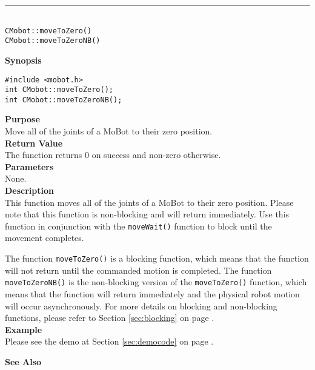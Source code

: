 \noindent
\vspace{5pt}
\rule{4.5in}{0.015in}\\
\noindent
{\LARGE \texttt{CMobot::moveToZero()}}\\
{\LARGE \texttt{CMobot::moveToZeroNB()}}\\
{}

\noindent
{\bf Synopsis}\\
\begin{verbatim}
#include <mobot.h>
int CMobot::moveToZero();
int CMobot::moveToZeroNB();
\end{verbatim}

\noindent
{\bf Purpose}\\
Move all of the joints of a MoBot to their zero position.\\

\noindent
{\bf Return Value}\\
The function returns 0 on success and non-zero otherwise.\\

\noindent
{\bf Parameters}\\
None.\\

\noindent
{\bf Description}\\
This function moves all of the joints of a MoBot to their zero position.
Please note that this function is non-blocking and will return immediately. Use
this function in conjunction with the \texttt{moveWait()} function to block
until the movement completes.

The function \texttt{moveToZero()} is a blocking function, which means that 
the function will not return until the commanded motion is 
completed. The function \texttt{moveToZeroNB()} is the non-blocking version of
the \texttt{moveToZero()} function, which means that the function will return
immediately and the physical robot motion will occur asynchronously. For
more details on blocking and non-blocking functions, please refer to 
Section \ref{sec:blocking} on page \pageref{sec:blocking}.\\

\noindent
{\bf Example}\\
Please see the demo at Section \ref{sec:democode} on page \pageref{sec:democode}.\\
\noindent

\noindent
{\bf See Also}\\

